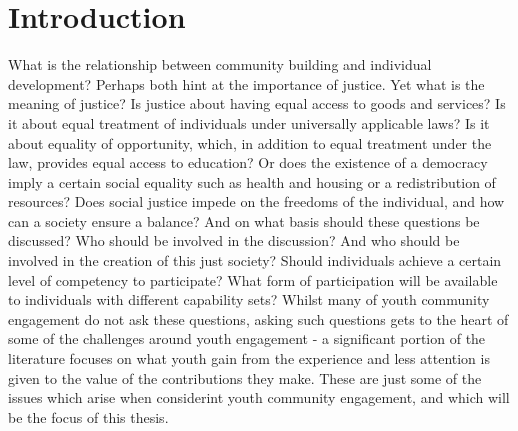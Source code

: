

\chapter {Introduction}
\label{Intro}

What is the relationship between community building and individual development? Perhaps both hint at the importance of justice. Yet what is the meaning of justice? Is justice about having equal access to goods and services? Is it about equal treatment of individuals under universally applicable laws? Is it about equality of opportunity, which, in addition to equal treatment under the law, provides equal access to education? Or does the existence of a democracy imply a certain social equality such as health and housing or a redistribution of resources? Does social justice impede on the freedoms of the individual, and how can a society ensure a balance? And on what basis should these questions be discussed? Who should be involved in the discussion? And who should be involved in the creation of this just society? Should individuals achieve a certain level of competency to participate? What form of participation will be available to individuals with different capability sets? Whilst many of youth community engagement do not ask these questions, asking such questions gets to the heart of some of the challenges around youth engagement - a significant portion of the literature focuses on what youth gain from the experience and less attention is given to the value of the contributions they make. These are just some of the issues which arise when considerint youth community engagement, and which will be the focus of this thesis.


